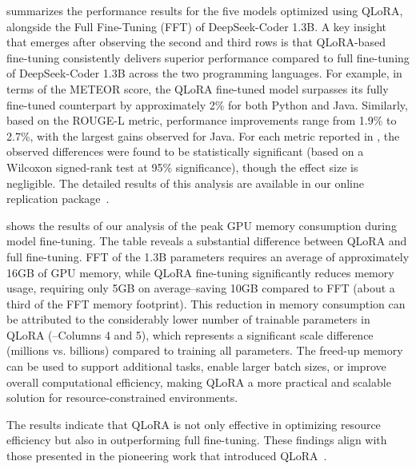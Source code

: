  summarizes the performance results for the five models optimized using QLoRA, alongside the Full Fine-Tuning (FFT) of DeepSeek-Coder 1.3B. A key insight that emerges after observing the second and third rows is that QLoRA-based fine-tuning consistently delivers superior performance compared to full fine-tuning of DeepSeek-Coder 1.3B across the two programming languages.
For example, in terms of the METEOR score, the QLoRA fine-tuned model surpasses its fully fine-tuned counterpart by approximately 2\% for both Python and Java. Similarly, based on the ROUGE-L metric, performance improvements range from 1.9\% to 2.7\%, with the largest gains observed for Java. For each metric reported in , the observed differences were found to be statistically significant (based on a Wilcoxon signed-rank test at 95\% significance), though the effect size is negligible. The detailed results of this analysis are available in our online replication package~\cite{replication}.

 shows the results of our analysis of the peak GPU memory consumption during model fine-tuning. The table reveals a substantial difference between QLoRA and full fine-tuning. FFT of the 1.3B parameters requires an average of approximately 16GB of GPU memory, while QLoRA fine-tuning significantly reduces memory usage, requiring only 5GB on average--saving 10GB compared to FFT (\ie about a third of the FFT memory footprint). 
This reduction in memory consumption can be attributed to the considerably lower number of trainable parameters in QLoRA (--Columns 4 and 5), which represents a significant scale difference (millions vs. billions) compared to training all parameters. The freed-up memory can be used to support additional tasks, enable larger batch sizes, or improve overall computational efficiency, making QLoRA a more practical and scalable solution for resource-constrained environments.


The results indicate that QLoRA is not only effective in optimizing resource efficiency but also in outperforming full fine-tuning. These findings align with those presented in the pioneering work that introduced QLoRA~\cite{dettmers2024qlora}. 
 
